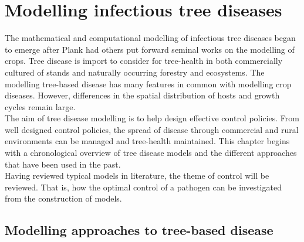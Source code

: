 

\chapter{Modelling infectious tree diseases}

The mathematical and computational modelling of infectious tree diseases began to emerge after Plank had others put forward seminal works on the modelling of crops. Tree disease is import to consider for tree-health in both commercially cultured of stands and naturally occurring forestry and ecosystems. The modelling tree-based disease has many features in common with modelling crop diseases. However, differences in the spatial distribution of hosts and growth cycles remain large.\\

The aim of tree disease modelling is to help design effective control policies. From well designed control policies, the spread of disease through commercial and rural environments can be managed and tree-health maintained. This chapter begins with a chronological overview of tree disease models and the different approaches that have been used in the past.\\

Having reviewed typical models in literature, the theme of control will be reviewed. That is, how the optimal control of a pathogen can be investigated from the construction of models.\\



\section{Modelling approaches to tree-based disease}

